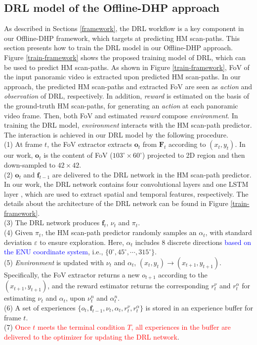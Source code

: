 \documentclass[10pt,journal,compsoc]{IEEEtran}
\begin{document}
\subsection{DRL model of the Offline-DHP approach}
\label{train}
As described in Sections \ref{framework}, the DRL workflow is a key component in our Offline-DHP framework, which targets at predicting HM scan-paths.
This section presents how to train the DRL model in our Offline-DHP approach.
Figure \ref{train-framework} shows the proposed training model of DRL, which can be used to predict HM scan-paths.
As shown in Figure \ref{train-framework},  FoV of the input panoramic video is extracted upon predicted HM scan-paths.
In our approach, the predicted HM scan-paths and extracted FoV are seen as \textit{action} and \textit{observation} of DRL, respectively.
In addition, \textit{reward} is estimated on the basis of the ground-truth HM scan-paths, for generating an \textit{action} at each panoramic video frame.
Then, both FoV and estimated \textit{reward} compose \textit{environment}.
In training the DRL model,  \textit{environment} interacts with the HM scan-path predictor.
The interaction is achieved in our DRL model by the following procedure.\\
(1) At frame $t$, the FoV extractor extracts $\mathbf{o}_t$ from $\mathbf{F}_t$ according to $(x_t,y_t)$.
In our work, $\mathbf{o}_{t}$ is the content of FoV ($103^{\circ} \times 60^{\circ}$) projected to 2D region and then down-sampled to $42\times42$.\\
(2) $\mathbf{o}_t$ and $\mathbf{f}_{t-1}$ are delivered to the DRL network in the HM scan-path predictor.
In our work, the DRL network contains four convolutional layers \cite{simonyan2014very} and one LSTM layer \cite{hochreiter1997long, hausknecht2015deep}, which are used to extract spatial and temporal features, respectively. The details about the architecture of the DRL network can be found in Figure \ref{train-framework}.\\
(3) The DRL network produces $\mathbf{f}_{t}$, $\nu_{t}$ and $\pi_{t}$.\\
(4) Given $\pi_{t}$, the HM scan-path predictor randomly samples an $\alpha_t$, with standard deviation $\varepsilon$ to ensure exploration. Here, $\alpha_t$ includes 8 discrete directions \textcolor{blue}{based on the ENU coordinate system}\cite{ENU}, i.e., $\{ 0^{\circ}, 45^{\circ}, \cdots, 315^{\circ} \}$.\\
(5) \textit{Environment} is updated with $\nu_t$ and $\alpha_t$, $(x_t, y_t)\longrightarrow (x_{t+1},y_{t+1})$. Specifically, the FoV extractor returns a new $o_{t+1}$ according to the $(x_{t+1},y_{t+1})$, and the reward estimator returns the corresponding $r^{\nu}_t$ and $r^{\alpha}_t$ for estimating $\nu_t$ and $\alpha_t$, upon $\nu^n_t$ and $\alpha^n_t$.\\
(6) A set of experiences $\{ o_{t}, \! \mathbf{f}_{t-1},\! \nu_t,\! \alpha_t,\! r^{\nu}_{t},\! r^{\alpha}_{t} \}$ is stored in an experience buffer for frame $t$.\\
(7) \textcolor{red}{Once $t$ meets the terminal condition $T$, all experiences in the buffer are delivered to the optimizer for updating the DRL network}.
\end{document}

